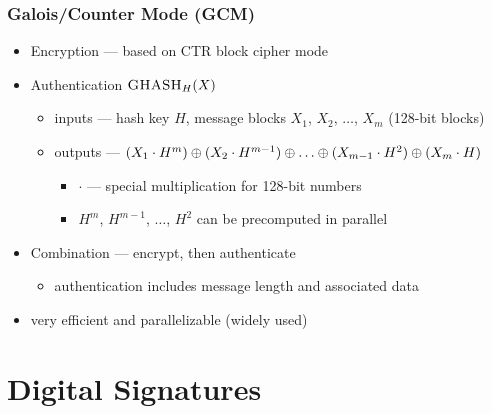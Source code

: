 \documentclass[draft]{article}
\begin{document}
\subsubsection{Galois/Counter Mode (GCM)}
\begin{itemize}[nosep]
    \item Encryption --- based on CTR block cipher mode
    \item Authentication $\textproc{GHASH}_H(X)$
          \begin{itemize}[nosep]
              \item inputs --- hash key $H$, message blocks $X_1$, $X_2$, $\dots$, $X_m$ (128-bit blocks)
              \item outputs --- $(X_1\cdot H^m) \xor (X_2\cdot H^{m-1}) \xor \dots \xor (X_{m-1}\cdot H^2) \xor (X_m\cdot H)$
                    \begin{itemize}[nosep]
                        \item $\cdot$ --- special multiplication for 128-bit numbers
                        \item $H^m$, $H^{m-1}$, $\dots$, $H^2$ can be precomputed in parallel
                    \end{itemize}
          \end{itemize}
    \item Combination --- encrypt, then authenticate
          \begin{itemize}[nosep]
              \item authentication includes message length and associated data
          \end{itemize}
    \item very efficient and parallelizable (widely used)
\end{itemize}
\section{Digital Signatures}
\end{document}
